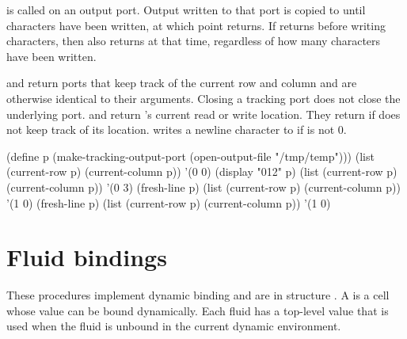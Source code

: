 \begin{protos}
\end{protos}
\noindent
{} is called on an output port.
Output written to that port is copied to  until 
 characters have been written, at which point  returns.
If  returns before writing  characters, then
  also returns at that time, regardless of how many
 characters have been written.

\begin{protos}
\end{protos}
\noindent {} and 
 return ports that keep track of the current row and column and
 are otherwise identical to their arguments.
Closing a tracking port does not close the underlying port.
 and  return
  's current read or write location.
They return  if  does not keep track of its location.
 writes a newline character to  if
  is not 0.

\begin{example}
(define p (make-tracking-output-port (open-output-file "/tmp/temp")))
(list (current-row p) (current-column p))
    \evalsto '(0 0)
(display "012" p)
(list (current-row p) (current-column p))
    \evalsto '(0 3)
(fresh-line p)
(list (current-row p) (current-column p))
    \evalsto '(1 0)
(fresh-line p)
(list (current-row p) (current-column p))
    \evalsto '(1 0)
\end{example}

\section{Fluid bindings}

These procedures implement dynamic binding and are in structure .
A  is a cell whose value can be bound dynamically.
Each fluid has a top-level value that is used when the fluid
 is unbound in the current dynamic environment.

